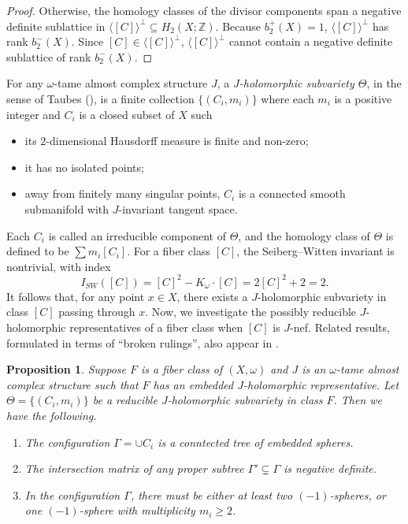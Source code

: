 \documentclass[11pt]{article}
\newtheorem{proposition}[theorem]{Proposition}
\theoremstyle{definition}
\theoremstyle{remark}
\begin{document}
\begin{proof}
  Otherwise, the homology classes of the divisor components span a negative definite sublattice in $\langle [C]\rangle^\perp\subseteq H_2(X;\mathbb{Z})$. Because $b_2^+(X)=1$, $\langle [C]\rangle^\perp$ has rank $b_2^-(X)$. Since $[C]\in \langle [C]\rangle^\perp$, $\langle [C]\rangle^\perp$ cannot contain a negative definite sublattice of rank $b_2^-(X)$.
\end{proof} 
For any $\omega$-tame almost complex structure $J$, a \emph{$J$-holomorphic subvariety $\Theta$}, in the sense of Taubes (\cite{Taubessubvariety}), is a finite collection $\{(C_i,m_i)\}$ where each $m_i$ is a positive integer and $C_i$ is a closed subset of $X$ such
\begin{itemize}[nosep]
 \item its $2$-dimensional Hausdorff measure is finite and non-zero;
        \item it has no isolated points;
        \item away from finitely many singular points, $C_i$ is a connected smooth submanifold with $J$-invariant tangent space.
\end{itemize} 
Each $C_i$ is called an irreducible component of $\Theta$, and the homology class of $\Theta$ is defined to be $\sum m_i[C_i]$. For a fiber class $[C]$, the Seiberg--Witten invariant is nontrivial, with index
\[I_{SW}([C])=[C]^2-K_\omega\cdot[C]=2[C]^2+2=2.\]
It follows that, for any point $x\in X$, there exists a $J$-holomorphic subvariety in class $[C]$ passing through $x$. Now, we investigate the possibly reducible $J$-holomorphic representatives of a fiber class when $[C]$ is $J$-nef. Related results, formulated in terms of ``broken rulings'', also appear in \cite[Section 4]{Markovstaircase}.


\begin{proposition}\label{prop:fiberclass}
  Suppose $F$ is a fiber class of $(X,\omega)$ and $J$ is an $\omega$-tame almost complex structure such that $F$ has an embedded $J$-holomorphic representative. Let $\Theta=\{(C_i,m_i)\}$ be a reducible $J$-holomorphic subvariety in class $F$. Then we have the following.
  \begin{enumerate}[nosep]
  \item The configuration $\Gamma=\cup C_i$ is a conntected tree of embedded spheres.
   \item The intersection matrix of any proper subtree $\Gamma'\subsetneq\Gamma$ is negative definite.
  \item In the configuration $\Gamma$, there must be either at least two $(-1)$-spheres, or one $(-1)$-sphere with multiplicity $m_i\geq 2$. 
\end{enumerate}
\end{proposition}
\end{document}
